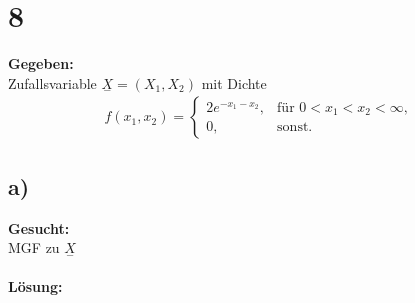 \documentclass{article}
\begin{document}
\section*{8} 
\textbf{Gegeben:}\\

Zufallsvariable $\underset{-}{X} =( X_1, X_2)$ mit Dichte 
\begin{align*}
    f(x_1, x_2) = 
    \begin{cases}
        2 e^{-x_1 - x_2}, & \text{für } 0 < x_1 < x_2 < \infty, \\
        0, & \text{sonst}.
    \end{cases}
\end{align*}
\subsection*{a)}
\textbf{Gesucht:}\\

MGF zu $\underset{-}{X}$ \\ \\
\textbf{Lösung:} 
\end{document}
